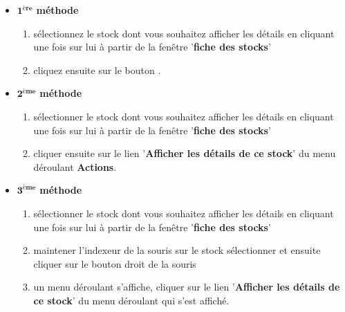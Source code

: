 \begin{itemize}[]
	\item \textcolor{purplish}{$\mathbf{1^{\text{\`ere}}}$ \textbf{m\'ethode}}
		\begin{enumerate}[1)]
			\item s\'electionnez le stock dont vous souhaitez
			afficher les d\'etails en cliquant une fois sur lui
			\` a partir de la fen\^etre '\textbf{fiche des stocks}'
			
			\item cliquez ensuite sur le bouton .	\\
		\end{enumerate}
	
	\item \textcolor{purplish}{$\mathbf{2^{\text{\`eme}}}$ \textbf{m\'ethode}}
		\begin{enumerate}[1)]
			\item s\'electionner le stock dont vous souhaitez
			afficher les d\'etails en cliquant une fois sur lui
			\` a partir de la fen\^etre '\textbf{fiche des stocks}'
			
			\item cliquer ensuite sur le lien '\textbf{Afficher les d\'etails de ce stock}'
			du menu d\'eroulant \textbf{Actions}.\\
		\end{enumerate}
	
	\item \textcolor{purplish}{$\mathbf{3^{\text{\`eme}}}$ \textbf{m\'ethode}}
		\begin{enumerate}[1)]
			\item s\'electionner le stock dont vous souhaitez
			afficher les d\'etails en cliquant une fois sur lui
			\` a partir de la fen\^etre '\textbf{fiche des stocks}'
			
			\item maintener l'indexeur de la souris sur le stock
				s\'electionner et ensuite cliquer sur le bouton
				droit de la souris
			
			\item un menu d\'eroulant s'affiche, cliquer sur
				le lien '\textbf{Afficher les d\'etails de ce stock}' du
				menu d\'eroulant qui s'est affich\'e. 
		\end{enumerate}
\end{itemize}

\newpage
{}

